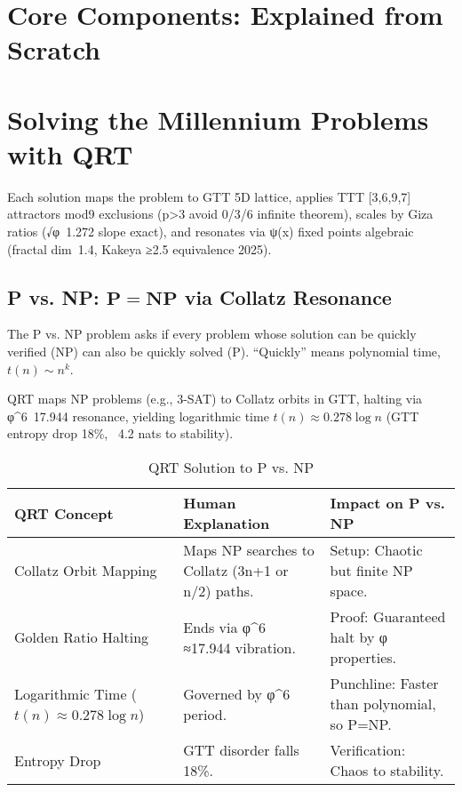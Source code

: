 \documentclass[12pt]{article}
\begin{document}
\section{Core Components: Explained from Scratch}


\section{Solving the Millennium Problems with QRT}

Each solution maps the problem to GTT 5D lattice, applies TTT [3,6,9,7] attractors mod9 exclusions (p>3 avoid 0/3/6 infinite theorem), scales by Giza ratios (√φ~1.272 slope exact), and resonates via ψ(x) fixed points algebraic (fractal dim~1.4, Kakeya ≥2.5 equivalence 2025).

\subsection{P vs. NP: $\mathbf{P = NP}$ via Collatz Resonance}

The P vs. NP problem asks if every problem whose solution can be quickly verified (NP) can also be quickly solved (P). ``Quickly'' means polynomial time, $t(n) \sim n^k$.

QRT maps NP problems (e.g., 3-SAT) to Collatz orbits in GTT, halting via φ^6~17.944 resonance, yielding logarithmic time $t(n) \approx 0.278 \log n$ (GTT entropy drop 18\%, ~4.2 nats to stability).

\begin{table}[h]
\centering
\begin{tabular}{lll}
\toprule
QRT Concept & Human Explanation & Impact on P vs. NP \\
\midrule
Collatz Orbit Mapping & Maps NP searches to Collatz (3n+1 or n/2) paths. & Setup: Chaotic but finite NP space. \\
Golden Ratio Halting & Ends via φ^6 ≈17.944 vibration. & Proof: Guaranteed halt by φ properties. \\
Logarithmic Time ($t(n) \approx 0.278 \log n$) & Governed by φ^6 period. & Punchline: Faster than polynomial, so P=NP. \\
Entropy Drop & GTT disorder falls 18\%. & Verification: Chaos to stability. \\
\bottomrule
\end{tabular}
\caption{QRT Solution to P vs. NP}
\end{table}
\end{document}
